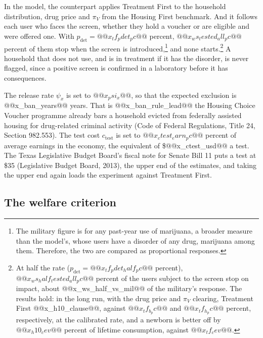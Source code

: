 \documentclass[10pt]{article}
\begin{document}
  In the model, the counterpart applies Treatment First to the household distribution, drug price and $\pi_V$ from the Housing First benchmark. And it follows each user who faces the screen, whether they hold a voucher or are eligible and were offered one. With $p_{\mathrm{det}}=@@x_tf_pdet_pc@@$ percent, $@@x_ws_tested_all_pc@@$ percent of them stop when the screen is introduced,\footnote{The military figure is for any past-year use of marijuana, a broader measure than the model's, whose users have a disorder of any drug, marijuana among them. Therefore, the two are compared as proportional responses.} and none starts.\footnote{\label{fn:halfrate}At half the rate ($p_{\mathrm{det}}=@@x_tf_pdet_half_pc@@$ percent), $@@x_ws_half_tested_all_pc@@$ percent of the users subject to the screen stop on impact, about @@x_ws_half_vs_mil@@ of the military's response. The results hold: in the long run, with the drug price and $\pi_V$ clearing, Treatment First @@x_h10_clause@@, against $@@x_tf_b_pc@@$ and $@@x_tf_h_pc@@$ percent, respectively, at the calibrated rate, and a newborn is better off by $@@x_h10_cev@@$ percent of lifetime consumption, against $@@x_tf_cev@@$.} A household that does not use, and is in treatment if it has the disorder, is never flagged, since a positive screen is confirmed in a laboratory before it has consequences.

The release rate $\psi_x$ is set to $@@x_psi_x@@$, so that the expected
exclusion is @@x_ban_years@@ years. That is @@x_ban_rule_lead@@ the Housing Choice Voucher programme
already bars a household evicted from federally assisted housing for drug-related criminal
activity (Code of Federal Regulations, Title 24, Section 982.553). The test cost $c_{\mathrm{test}}$ is set to $@@x_ctest_earn_pc@@$ percent of average earnings in the economy, the equivalent of
\$@@x_ctest_usd@@ a test. The Texas Legislative Budget Board's fiscal note for Senate Bill 11 puts a test at \$35 (Legislative Budget Board, 2013), the upper end of the estimates, and taking the upper end again loads the experiment against Treatment First.

\subsection{The welfare criterion}\label{sec:cev}
\end{document}

